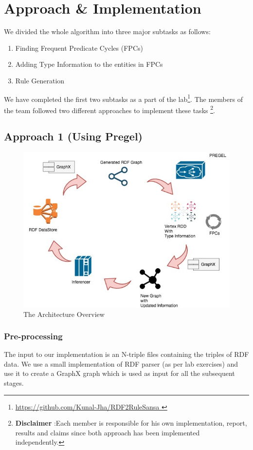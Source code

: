 \documentclass{easychair}
\begin{document}
\section{Approach \& Implementation}


We divided the whole algorithm into three major subtasks as follows:
\begin{enumerate}
\item Finding Frequent Predicate Cycles (FPCs)
\item Adding Type Information to the entities in FPCs
\item Rule Generation
\end{enumerate}
We have completed the first two subtasks as a part of the lab\footnote{\url{ https://github.com/Kunal-Jha/RDF2RuleSansa }}. The members of the team followed two different approaches to implement these tasks \footnote{\textbf{Disclaimer} :Each member is responsible for his own implementation, report, results and claims since both approach has been implemented independently.}.
\subsection{Approach 1 (Using Pregel)}
\begin{figure}[tb]
	\begin{centering}
	\includegraphics[width=1\textwidth]{RDf2Rule.jpg}
	\caption{The Architecture Overview}
	\label{fig:architecture}
	\end{centering}
\end{figure}

\subsubsection{Pre-processing}
The input to our implementation is an N-triple files containing the triples of RDF data.  We use a small implementation of RDF parser (as per lab exercises) and use it to create a GraphX graph which is used as input for all the subsequent stages.
\end{document}
